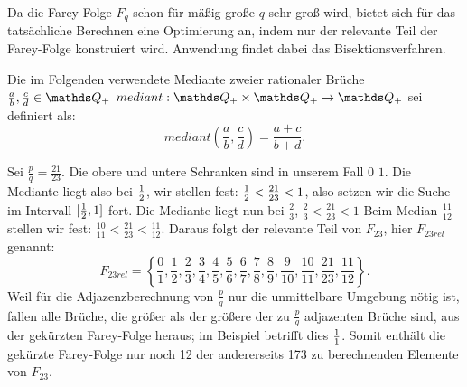 Da die Farey-Folge $F_q$ schon für mäßig große $q$ sehr groß wird, bietet sich für das tatsächliche Berechnen eine Optimierung an, indem nur der relevante Teil der Farey-Folge konstruiert wird. Anwendung findet dabei das Bisektionsverfahren.
\begin{def1}\label{def:mediant}
	Die im Folgenden verwendete Mediante zweier rationaler Brüche $\frac{a}{b}, \frac{c}{d} \in \Q_+$ $mediant: \Q_+ \times \Q_+ \rightarrow \Q_+$ sei definiert als:
	$$mediant \left(\frac{a}{b}, \frac{c}{d}\right) = \frac{a+c}{b+d}.$$
\end{def1}
\begin{bsp}
	Sei $\frac{p}{q} = \frac{21}{23}$. Die obere und untere Schranken sind in unserem Fall $0$ \bzw $1$. Die Mediante liegt also bei $\frac{1}{2}$, wir stellen fest: $\frac{1}{2}<\frac{21}{23}<1$, also setzen wir die Suche im Intervall $[\frac{1}{2}, 1]$ fort. Die Mediante liegt nun bei $\frac{2}{3}$, $\frac{2}{3}<\frac{21}{23}<1$ \usw
	Beim Median $\frac{11}{12}$ stellen wir fest: $\frac{10}{11} < \frac{21}{23} < \frac{11}{12}.$ Daraus folgt der relevante Teil von $F_{23}$, hier $F_{23rel}$ genannt: $$F_{23rel} = \left\{\frac{0}{1}, \frac{1}{2}, \frac{2}{3}, \frac{3}{4}, \frac{4}{5}, \frac{5}{6}, \frac{6}{7}, \frac{7}{8}, \frac{8}{9}, \frac{9}{10}, \frac{10}{11}, \frac{21}{23}, \frac{11}{12}\right\}.$$
	Weil für die Adjazenzberechnung von $\frac{p}{q}$ nur die unmittelbare Umgebung nötig ist, fallen alle Brüche, die größer als der größere der zu $\frac{p}{q}$ adjazenten Brüche sind, aus der gekürzten Farey-Folge heraus; im Beispiel betrifft dies $\frac{1}{1}$.
	Somit enthält die gekürzte Farey-Folge nur noch 12 der andererseits 173 zu berechnenden Elemente von $F_{23}$.
\end{bsp}

